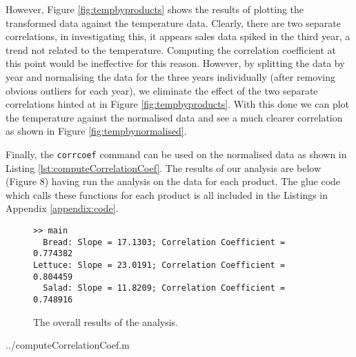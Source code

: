 


However, Figure \ref{fig:tempbyproducts} shows the results of plotting the transformed data against the temperature data. Clearly, there are two separate correlations, in investigating this, it appears sales data spiked in the third year, a trend not related to the temperature. Computing the correlation coefficient at this point would be ineffective for this reason. However, by splitting the data by year and normalising the data for the three years individually (after removing obvious outliers for each year), we eliminate the effect of the two separate correlations hinted at in Figure \ref{fig:tempbyproducts}. With this done we can plot the temperature against the normalised data and see a much clearer correlation as shown in Figure \ref{fig:tempbynormalised}.

Finally, the \texttt{corrcoef} command can be used on the normalised data as shown in Listing \ref{lst:computeCorrelationCoef}. The results of our analysis are below (Figure 8) having run the analysis on the data for each product. The glue code which calls these functions for each product is all included in the Listings in Appendix \ref{appendix:code}.

\begin{figure}[h!]

\begin{verbatim}
>> main
  Bread: Slope = 17.1303; Correlation Coefficient = 0.774382
Lettuce: Slope = 23.0191; Correlation Coefficient = 0.804459
  Salad: Slope = 11.8209; Correlation Coefficient = 0.748916
\end{verbatim}
\label{fig:output1}
\caption{The overall results of the analysis.}
\end{figure}



 {../computeCorrelationCoef.m}


